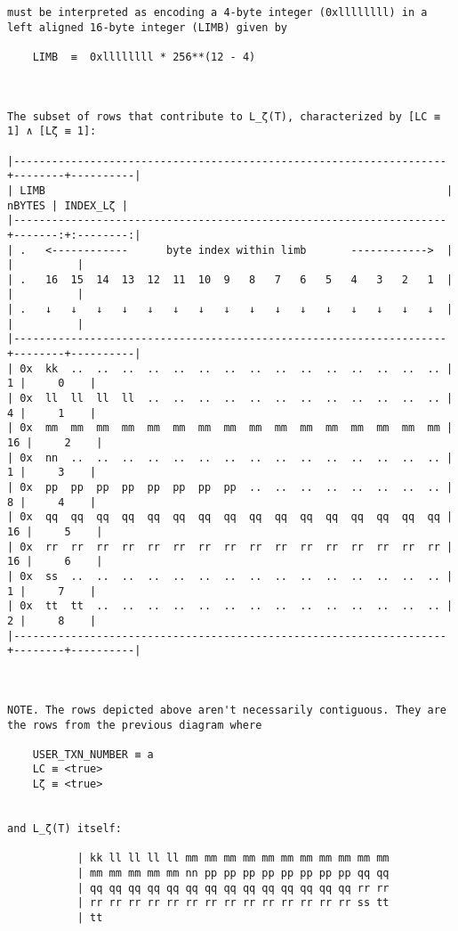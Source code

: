 \documentclass[varwidth=\maxdimen,margin=0.5cm,multi={verbatim}]{standalone}
\begin{document}
\begin{verbatim}
must be interpreted as encoding a 4-byte integer (0xllllllll) in a left aligned 16-byte integer (LIMB) given by

    LIMB  ≡  0xllllllll * 256**(12 - 4)



The subset of rows that contribute to L_ζ(T), characterized by [LC ≡ 1] ∧ [Lζ ≡ 1]:

|--------------------------------------------------------------------+--------+----------|
| LIMB                                                               | nBYTES | INDEX_Lζ |
|--------------------------------------------------------------------+-------:+:--------:|
| .   <------------      byte index within limb       ------------>  |        |          |
| .   16  15  14  13  12  11  10  9   8   7   6   5   4   3   2   1  |        |          |
| .   ↓   ↓   ↓   ↓   ↓   ↓   ↓   ↓   ↓   ↓   ↓   ↓   ↓   ↓   ↓   ↓  |        |          |
|--------------------------------------------------------------------+--------+----------|
| 0x  kk  ..  ..  ..  ..  ..  ..  ..  ..  ..  ..  ..  ..  ..  ..  .. |      1 |     0    |
| 0x  ll  ll  ll  ll  ..  ..  ..  ..  ..  ..  ..  ..  ..  ..  ..  .. |      4 |     1    |
| 0x  mm  mm  mm  mm  mm  mm  mm  mm  mm  mm  mm  mm  mm  mm  mm  mm |     16 |     2    |
| 0x  nn  ..  ..  ..  ..  ..  ..  ..  ..  ..  ..  ..  ..  ..  ..  .. |      1 |     3    |
| 0x  pp  pp  pp  pp  pp  pp  pp  pp  ..  ..  ..  ..  ..  ..  ..  .. |      8 |     4    |
| 0x  qq  qq  qq  qq  qq  qq  qq  qq  qq  qq  qq  qq  qq  qq  qq  qq |     16 |     5    |
| 0x  rr  rr  rr  rr  rr  rr  rr  rr  rr  rr  rr  rr  rr  rr  rr  rr |     16 |     6    |
| 0x  ss  ..  ..  ..  ..  ..  ..  ..  ..  ..  ..  ..  ..  ..  ..  .. |      1 |     7    |
| 0x  tt  tt  ..  ..  ..  ..  ..  ..  ..  ..  ..  ..  ..  ..  ..  .. |      2 |     8    |
|--------------------------------------------------------------------+--------+----------|



NOTE. The rows depicted above aren't necessarily contiguous. They are the rows from the previous diagram where

    USER_TXN_NUMBER ≡ a
    LC ≡ <true>
    Lζ ≡ <true>


and L_ζ(T) itself:

           | kk ll ll ll ll mm mm mm mm mm mm mm mm mm mm mm
           | mm mm mm mm mm nn pp pp pp pp pp pp pp pp qq qq
           | qq qq qq qq qq qq qq qq qq qq qq qq qq qq rr rr
           | rr rr rr rr rr rr rr rr rr rr rr rr rr rr ss tt
           | tt
\end{verbatim}
\end{document}

